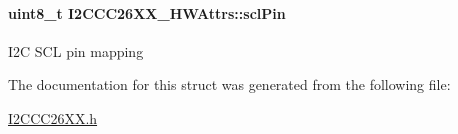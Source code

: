 \paragraph[{scl\+Pin}]{\setlength{\rightskip}{0pt plus 5cm}uint8\+\_\+t I2\+C\+C\+C26\+X\+X\+\_\+\+H\+W\+Attrs\+::scl\+Pin}\label{struct_i2_c_c_c26_x_x___h_w_attrs_a05531669bc614278c181e2720499f1b6}
I2\+C S\+C\+L pin mapping 

The documentation for this struct was generated from the following file\+:\begin{DoxyCompactItemize}
\item 
\hyperlink{_i2_c_c_c26_x_x_8h}{I2\+C\+C\+C26\+X\+X.\+h}\end{DoxyCompactItemize}
